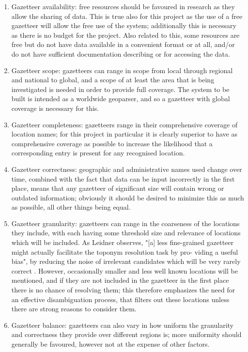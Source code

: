 \documentclass[12pt, a4paper]{report}
\begin{document}
\begin{enumerate}
	\item { Gazetteer availability: free resources should be favoured in research as they allow the sharing of data. This is true also for this project as the use of a free gazetteer will allow the free use of the system; additionally this is necessary as there is no budget for the project. Also related to this, some resources are free but do not have data available in a convenient format or at all, and/or do not have sufficient documentation describing or for accessing the data.
	}
	\item { Gazetteer scope: gazetteers can range in scope from local through regional and national to global, and a scope of at least the area that is being investigated is needed in order to provide full coverage. The system to be built is intended as a worldwide geoparser, and so a gazetteer with global coverage is necessary for this. 
	}
	\item { Gazetteer completeness: gazetteers range in their comprehensive coverage of location names; for this project in particular it is clearly superior to have as comprehensive coverage as possible to increase the likelihood that a corresponding entry is present for any recognised location. 
	}
	\item { Gazetteer correctness: geographic and administrative names used change over time, combined with the fact that data can be input incorrectly in the first place, means that any gazetteer of significant size will contain wrong or outdated information; obviously it should be desired to minimize this as much as possible, all other things being equal.
	}
	\item { Gazetteer granularity: gazetteers can range in the coarseness of the locations they include, with each having some threshold size and relevance of locations which will be included. As Leidner observes, "[a] less fine-grained gazetteer might
actually facilitate the toponym resolution task by pro-
viding a useful bias", by reducing the noise of irrelevant candidates which will be very rarely correct \citep{leidner2004}. However, occasionally smaller and less well known locations will be mentioned, and if they are not included in the gazetteer in the first place there is no chance of resolving them; this therefore emphasizes the need for an effective disambiguation process, that filters out these locations unless there are strong reasons to consider them. 
	}
	\item { Gazetteer balance: gazetteers can also vary in how uniform the granularity and correctness they provide over different regions is; more uniformity should generally be favoured, however not at the expense of other factors.
}
\end{enumerate}
\end{document}
